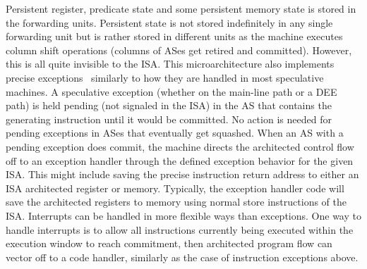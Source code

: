 \documentclass[10pt,twocolumn,dvips]{article}
\begin{document}
Persistent register, predicate state and some persistent
memory state is stored in the forwarding units.
Persistent state is not stored indefinitely in any single forwarding
unit but is rather stored in different units as the machine
executes column shift operations (columns of ASes get retired
and committed).  However, this is all quite invisible to the ISA.
This microarchitecture also implements precise exceptions~\cite{Smi88}
similarly to how they
are handled in most speculative machines.  
A speculative exception (whether on the main-line path or a DEE path)
is held pending (not signaled in the ISA)
in the AS that contains the generating
instruction until it would be committed.
No action is needed for pending exceptions in ASes that eventually
get squashed.
When an AS with a pending exception does commit, the machine directs the
architected control flow off to an exception handler through
the defined exception behavior for the given ISA.
This might include saving the precise instruction return
address to either an ISA architected register or memory.
Typically, the exception handler code will save the architected
registers to memory using normal
store instructions of the ISA.
Interrupts can be handled in more flexible ways than exceptions.
One way to handle interrupts is to allow all instructions
currently being executed within the execution window to reach
commitment, then architected program flow can vector off to
a code handler, similarly as the case of instruction exceptions above.
%
%
\end{document}
